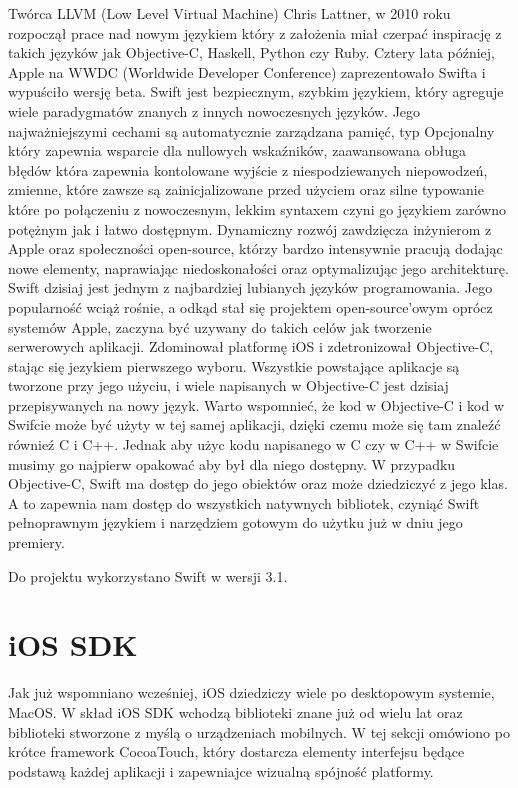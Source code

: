 Twórca LLVM (Low Level Virtual Machine) Chris Lattner, w 2010 roku rozpoczął prace nad nowym językiem który z założenia miał czerpać
inspirację z takich języków jak Objective-C, Haskell, Python czy Ruby. Cztery lata później, Apple na WWDC (Worldwide Developer
Conference) zaprezentowało Swifta i wypuściło wersję beta. Swift jest bezpiecznym, szybkim językiem, który agreguje wiele paradygmatów
znanych z innych nowoczesnych języków. Jego najważniejszymi cechami są automatycznie zarządzana pamięć, typ Opcjonalny który zapewnia
wsparcie dla nullowych wskaźników, zaawansowana obługa błędów która zapewnia kontolowane wyjście z niespodziewanych niepowodzeń, zmienne,
które zawsze są zainicjalizowane przed użyciem oraz silne typowanie które po połączeniu z nowoczesnym, lekkim syntaxem czyni go językiem
zarówno potężnym jak i łatwo dostępnym. Dynamiczny rozwój zawdzięcza inżynierom z Apple oraz społeczności open-source, którzy bardzo
intensywnie pracują dodając nowe elementy, naprawiając niedoskonałości oraz optymalizując jego architekturę. Swift dzisiaj jest jednym
z najbardziej lubianych języków programowania. Jego popularność wciąż rośnie, a odkąd stał się projektem open-source'owym oprócz
systemów Apple, zaczyna być uzywany do takich celów jak tworzenie serwerowych aplikacji. Zdominował platformę iOS i zdetronizował
Objective-C, stając się jezykiem pierwszego wyboru. Wszystkie powstające aplikacje są tworzone przy jego użyciu, i wiele napisanych w
Objective-C jest dzisiaj przepisywanych na nowy język. Warto wspomnieć, że kod w Objective-C i kod w Swifcie może być użyty w tej samej
aplikacji, dzięki czemu może się tam znaleźć równieź C i C++. Jednak aby użyc kodu napisanego w C czy w C++ w Swifcie musimy go najpierw
opakować aby był dla niego dostępny. W przypadku Objective-C, Swift ma dostęp do jego obiektów oraz może dziedziczyć z jego klas. A to
zapewnia nam dostęp do wszystkich natywnych bibliotek, czyniąć Swift pełnoprawnym językiem i narzędziem gotowym do użytku już w dniu
jego premiery.

Do projektu wykorzystano Swift w wersji 3.1.

\section{iOS SDK}

Jak już wspomniano wcześniej, iOS dziedziczy wiele po desktopowym systemie, MacOS. W skład iOS SDK wchodzą biblioteki znane już od wielu
lat oraz biblioteki stworzone z myślą o urządzeniach mobilnych. W tej sekcji omówiono po krótce framework CocoaTouch, który dostarcza
elementy interfejsu będące podstawą każdej aplikacji i zapewniajce wizualną spójność platformy.

